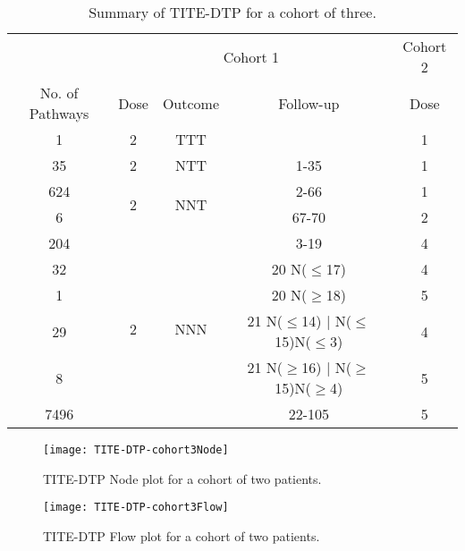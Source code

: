 \begin{table}[h!]
	\centering
	\caption{Summary of TITE-DTP for a cohort of three.}
	\label{tab_tite-dtp:TITEDTP_c3_Sum}
	\begin{tabular}{ccccc}
		\toprule
		\multicolumn{1}{l}{} & 				   \multicolumn{3}{c}{Cohort 1}                       & Cohort 2 \\ 
		\cmidrule(l{3pt}r{3pt}){2-4} \cmidrule(l{3pt}r{3pt}){5-5}
		No. of Pathways & Dose                 & Outcome              & Follow-up 								  & Dose     \\ \hline
		1				& 2                    & TTT                  &           								  & 1        \\ \hline
		35				& 2                    & NTT                  & 1-35      								  & 1        \\ \hline
		624				& \multirow{2}{*}{2}   & \multirow{2}{*}{NNT} & 2-66      								  & 1        \\
		6				&					   &                      & 67-70     								  & 2        \\ \hline
		204				& \multirow{6}{*}{2}   & \multirow{6}{*}{NNN} & 3-19      								  & 4        \\
		32				&					   &                      & 20 N($\leq$17)    						  & 4        \\
		1				&					   &                      & 20 N($\geq$18)    						  & 5        \\
		29				&					   &                      & 21 N($\leq$14) | N($\leq$15)N($\leq$3)    & 4        \\
		8				&					   &                      & 21 N($\geq$16) | N($\geq$15)N($\geq$4)    & 5        \\
		7496			&					   &                      & 22-105    								  & 5        \\ 
		\bottomrule
	\end{tabular}
\end{table}

\begin{figure}[h!]
	\centering
	\caption{TITE-DTP Node plot for a cohort of two patients.}
	\label{fig_tite-dtp:TITEDTP-cohort3-node}
	\texttt{[image: TITE-DTP-cohort3Node]}
\end{figure}

\clearpage

\begin{figure}[h!]
	\centering
	\caption{TITE-DTP Flow plot for a cohort of two patients.}
	\label{fig_tite-dtp:TITEDTP-cohort3-flow}
	\texttt{[image: TITE-DTP-cohort3Flow]}
\end{figure}

